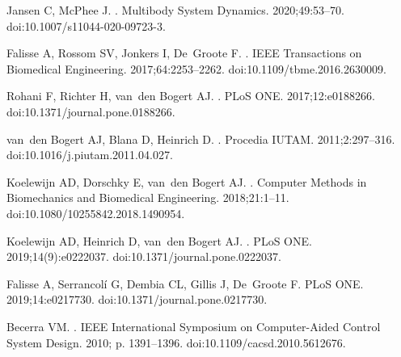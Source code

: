 \documentclass[10pt,letterpaper]{article}
\begin{document}
\begin{thebibliography}{10}
    Jansen C, McPhee J.
    .
    \newblock Multibody System Dynamics. 2020;49:53--70.
    \newblock doi:{10.1007/s11044-020-09723-3}.

    Falisse A, Rossom SV, Jonkers I, De~Groote F.
    .
    \newblock IEEE Transactions on Biomedical Engineering. 2017;64:2253--2262.
    \newblock doi:{10.1109/tbme.2016.2630009}.

    Rohani F, Richter H, van~den Bogert AJ.
    .
    \newblock PLoS ONE. 2017;12:e0188266.
    \newblock doi:{10.1371/journal.pone.0188266}.

    van~den Bogert AJ, Blana D, Heinrich D.
    .
    \newblock Procedia IUTAM. 2011;2:297--316.
    \newblock doi:{10.1016/j.piutam.2011.04.027}.

    Koelewijn AD, Dorschky E, van~den Bogert AJ.
    .
    \newblock Computer Methods in Biomechanics and Biomedical Engineering.
    2018;21:1--11.
    \newblock doi:{10.1080/10255842.2018.1490954}.

    Koelewijn AD, Heinrich D, van~den Bogert AJ.
    .
    \newblock PLoS ONE. 2019;14(9):e0222037.
    \newblock doi:{10.1371/journal.pone.0222037}.

    Falisse A, Serrancolí G, Dembia CL, Gillis J, De~Groote F.
    \newblock PLoS ONE. 2019;14:e0217730.
    \newblock doi:{10.1371/journal.pone.0217730}.

    Becerra VM.
    .
     IEEE International Symposium on Computer-Aided Control System
    Design. 2010; p. 1391--1396.
    \newblock doi:{10.1109/cacsd.2010.5612676}.


\end{thebibliography}
\end{document}
